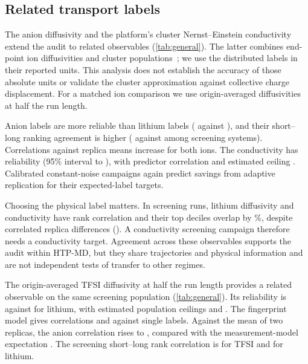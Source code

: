 \documentclass[preprint,12pt]{elsarticle}
\begin{document}
\subsection{Related transport labels}\label{sec:res-general}
\ifconductivityready
The anion diffusivity and the platform's cluster Nernst--Einstein conductivity
extend the audit to related observables (\cref{tab:general}). The latter combines end-point ion
diffusivities and cluster populations~\cite{FranceLanord2019NernstEinstein}; we use the distributed
labels in their reported units. This analysis does not establish the accuracy of those absolute
units or validate the cluster approximation against collective charge displacement.
For a matched ion comparison we use origin-averaged diffusivities at half the run length.

Anion labels are more reliable than lithium labels (\genTfsiRel{} against \genLiRel), and their
short--long ranking agreement is higher (\genTfsiRhoScreen{} against \genLiRhoScreen{} among
screening systems). Correlations against replica means increase for both ions. The conductivity
has reliability \genCondRel{} (95\% interval \genCondRelLo{} to \genCondRelHi), with predictor
correlation \genCondMl{} and estimated ceiling \genCondCeil. Calibrated constant-noise campaigns again predict savings from adaptive replication
for their expected-label targets.

Choosing the physical label matters. In screening runs, lithium diffusivity and conductivity have
rank correlation \genCondVsLiRhoShort{} and their top deciles overlap by
\genCondVsLiTopTenPct\%, despite correlated replica differences (\genCondVsLiNoiseCorr).
A conductivity screening campaign therefore needs a conductivity target. Agreement across these
observables supports the audit within HTP-MD, but they share trajectories and physical information
and are not independent tests of transfer to other regimes.

\else
The origin-averaged TFSI diffusivity at half the run length provides a related observable on the
same screening population (\cref{tab:general}). Its reliability is \genTfsiRel{} against
\genLiRel{} for lithium, with estimated population ceilings \genTfsiCeil{} and \genLiCeil{}.
The fingerprint model gives correlations \genTfsiMl{} and \genLiMl{} against single labels.
Against the mean of two replicas, the anion correlation rises to \genTfsiMlMean{}, compared
with the measurement-model expectation \genTfsiMlMeanExp{}. The screening short--long rank
correlation is \genTfsiRhoScreen{} for TFSI and \genLiRhoScreen{} for lithium.
\end{document}
